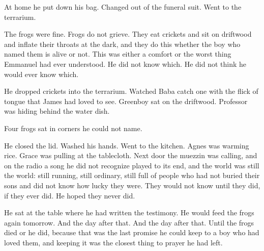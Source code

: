 \documentclass[11pt]{article}
\begin{document}
At home he put down his bag. Changed out of the funeral suit. Went to the terrarium.

The frogs were fine. Frogs do not grieve. They eat crickets and sit on driftwood and inflate their throats at the dark, and they do this whether the boy who named them is alive or not. This was either a comfort or the worst thing Emmanuel had ever understood. He did not know which. He did not think he would ever know which.

He dropped crickets into the terrarium. Watched Baba catch one with the flick of tongue that James had loved to see. Greenboy sat on the driftwood. Professor was hiding behind the water dish.

Four frogs sat in corners he could not name.

He closed the lid. Washed his hands. Went to the kitchen. Agnes was warming rice. Grace was pulling at the tablecloth. Next door the muezzin was calling, and on the radio a song he did not recognize played to its end, and the world was still the world: still running, still ordinary, still full of people who had not buried their sons and did not know how lucky they were. They would not know until they did, if they ever did. He hoped they never did.

He sat at the table where he had written the testimony. He would feed the frogs again tomorrow. And the day after that. And the day after that. Until the frogs died or he did, because that was the last promise he could keep to a boy who had loved them, and keeping it was the closest thing to prayer he had left.
\end{document}
